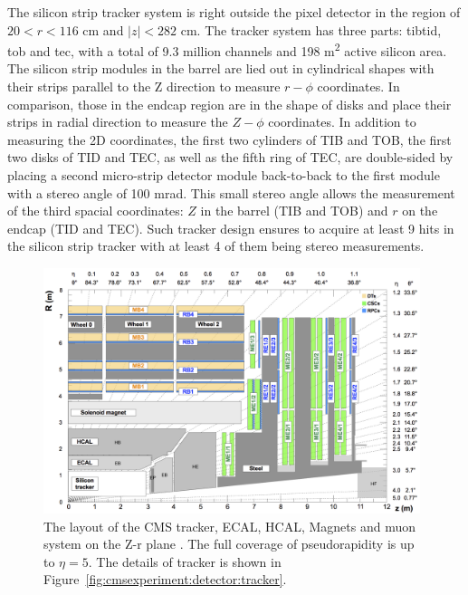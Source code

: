  The silicon strip tracker system is right outside the pixel detector in the region of $20<r<116$ cm and $|z|<282$ cm. The tracker system has three parts: \acrfull{tibtid}, \acrfull{tob} and \acrfull{tec}, with a total of 9.3 million channels and 198 \si{\m \squared} active silicon area. The silicon strip modules in the barrel are lied out in cylindrical shapes with their strips parallel to the Z direction to measure $r-\phi$ coordinates. In comparison, those in the endcap region are in the shape of disks and place their strips in radial direction to measure the $Z-\phi$ coordinates. In addition to measuring the 2D coordinates, the first two cylinders of TIB and TOB, the first two disks of TID and TEC, as well as the fifth ring of TEC, are double-sided by placing a second micro-strip detector module back-to-back to the first module with a stereo angle of 100 mrad. This small stereo angle allows the measurement of the third spacial coordinates: $Z$ in the barrel (TIB and TOB) and $r$ on the endcap (TID and TEC). Such tracker design ensures to acquire at least 9 hits in the silicon strip tracker with at least 4 of them being stereo measurements. 




\begin{figure}[ht]
    \centering
    \includegraphics[width=0.98\textwidth]{chapters/CMSExperiment/sectionDetector/figures/detectorLayout.png}
    \caption{The layout of the CMS tracker, ECAL, HCAL, Magnets and muon system on the Z-r plane \cite{cms:muonChamberWebsite}. The full coverage of pseudorapidity is up to $\eta=5$. The details of tracker is shown in Figure~\ref{fig:cmsexperiment:detector:tracker}. }
    \label{fig:cmsexperiment:detector:detectorLayout}
\end{figure}





